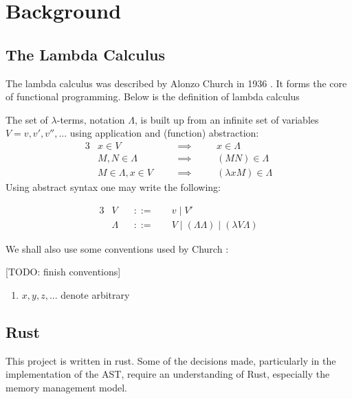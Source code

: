 \chapter{Background}
\label{chap:technical}

\section{The Lambda Calculus}
The lambda calculus was described by Alonzo Church in 1936 \cite{church1936unsolvable}. It forms the core of functional programming. Below is the definition of lambda calculus \cite{barendregt2013lambda}
\begin{definition}
    The set of $\lambda$-terms, notation $\Lambda$, is built up from an infinite set of variables $V={v,v',v'',...}$ using application and (function) abstraction:
    \begin{alignat*}{3}
    &x \in V                 \quad && \implies \quad && x \in \Lambda\\
    &M,N \in \Lambda         \quad && \implies \quad && (M N) \in \Lambda\\
    &M \in \Lambda, x\in V   \quad && \implies \quad && (\lambda x M) \in \Lambda 
    \end{alignat*}
    Using abstract syntax one may write the following:
    
    \begin{alignat*}{3}
    &V       && ::= \; && v \mid V'\\
    &\Lambda && ::= \; && V \mid (\Lambda\Lambda) \mid (\lambda V\Lambda)
    \end{alignat*}
\end{definition}

We shall also use some conventions used by Church \cite{church1941calculi}:

[TODO: finish conventions]
\begin{convention}
\begin{enumerate}
    \item \(x, y, z,...\) denote arbitrary
\end{enumerate}
\end{convention}



\section{Rust}
\label{bg:rust}
This project is written in rust. Some of the decisions made, particularly in the implementation of the AST, require an understanding of Rust, especially the memory management model.

